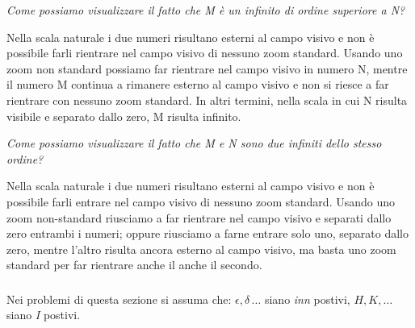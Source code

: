 \begin{esercizio}\label{ese:iper_043} 
\emph{Come possiamo visualizzare il fatto che M è un infinito di ordine 
superiore a N?}

Nella scala naturale i due numeri risultano esterni al campo visivo e non è 
possibile farli rientrare nel campo visivo di nessuno zoom standard. Usando 
uno zoom non standard possiamo far rientrare nel campo visivo in numero N, 
mentre il numero M continua a rimanere esterno al campo visivo e non si 
riesce a far rientrare con nessuno zoom standard. In altri termini, nella 
scala in cui N risulta visibile e separato dallo zero, M risulta infinito.
\end{esercizio}

\begin{esercizio}\label{ese:iper_044} 
\emph{Come possiamo visualizzare il fatto che M e N sono due infiniti dello 
stesso ordine?}

Nella scala naturale i due numeri risultano esterni al campo visivo e non è 
possibile farli entrare nel campo visivo di nessuno zoom standard. Usando 
uno zoom non-standard riusciamo a far rientrare nel campo visivo e separati 
dallo zero entrambi i numeri; oppure riusciamo a farne entrare solo uno, 
separato dallo zero, mentre l'altro risulta ancora esterno al campo visivo, 
ma basta uno zoom standard per far rientrare anche il anche il secondo.
\end{esercizio}

\subsubsection*{}

Nei problemi di questa sezione si assuma che: 
\(\epsilon, \delta\, \dots\) siano \emph{inn} postivi, 
\(H, K, \dots\) siano \emph{I} postivi.

